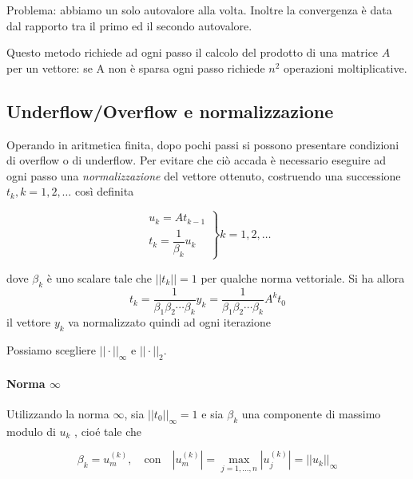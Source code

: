 Problema: abbiamo un solo autovalore alla volta. Inoltre la convergenza
\`e data dal rapporto tra il primo ed il secondo autovalore.

Questo metodo richiede ad ogni passo il calcolo del prodotto di una
matrice $A$ per un vettore: se A non è sparsa ogni passo richiede $n^2$
operazioni moltiplicative.


\subsection{Underflow/Overflow e normalizzazione}
Operando in aritmetica finita, dopo pochi passi si
possono presentare condizioni di overflow o di underflow.
Per evitare che ci\`o accada \`e necessario eseguire ad ogni passo una
\emph{normalizzazione} del vettore ottenuto, costruendo una successione
 $t_k , k = 1, 2, \ldots $ cos\`i definita

\begin{equation}
  \label{eigenvalues:05}
\left.
\begin{array}{l}
u_k = A t_{k-1} \\
t_k = \dfrac{1}{\beta_k}u_k
\end{array}
\right\}
k=1,2,\ldots
\end{equation}

dove $\beta_k$ \`e uno scalare tale che $||t_k|| = 1$ per qualche norma vettoriale.
Si ha allora
$$t_k = \dfrac{1}{\beta_1 \beta_2 \cdots \beta_k}y_k =
\dfrac{1}{\beta_1 \beta_2 \cdots \beta_k}A^{k}t_0
$$
il vettore $y_k$ va normalizzato quindi ad ogni iterazione

Possiamo scegliere $||\cdot||_{\infty}$ e  $||\cdot||_{2}$.
\paragraph{Norma $\infty$}
Utilizzando la norma $\infty$, sia $||t_0||_{\infty} = 1$ e sia
$\beta_k$ una componente di massimo modulo di $u_k$ , cio\'e tale che

$$
\beta_k = u_{m}^{(k)}, \quad \text{con} \quad
|u_m^{(k)}| = \max_{j=1, \ldots,n} |u_j^{(k)}| = ||u_k||_{\infty}
$$

